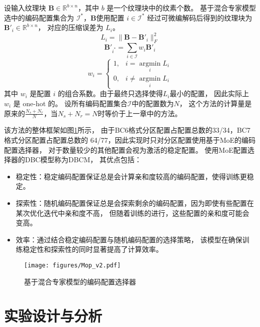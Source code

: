 设输入纹理块 $\mathbf{B}\in\mathbb{R}^{b\times n}$，其中 $b$ 是一个纹理块中的纹素个数。
基于混合专家模型选中的编码配置集合为 $\mathcal{I}^*$，$\mathbf{B}$使用配置 $i\in\mathcal{I}^*$ 
经过可微编解码后得到的纹理块为 $\mathbf{B}'_i\in\mathbb{R}^{b\times n}$，
对应的压缩误差为 $L_i$。
\begin{equation}
L_i=\|\mathbf{B}-\mathbf{B}'_i\|_F^2
\end{equation}
\begin{equation}
\mathbf{B}'_{i^*}=\sum_{i\in\mathcal{I}} w_i\mathbf{B}'_i
\end{equation}
\begin{equation}
    w_i =\left\{\begin{matrix}
        1,& i=\mathop{\arg\min}\limits_{i} L_i
        \\0,& i\ne\mathop{\arg\min}\limits_{i} L_i
        \end{matrix}\right.
\end{equation}
其中 $w_i$ 是配置 $i$ 的组合系数。由于最终只选择使得$L_i$最小的配置，
因此实际上 $w_i$ 是 one-hot 的。
设所有编码配置集合$\mathcal{I}$中的配置数为$N$，
这个方法的计算量是原来的$\frac{N_s+N_r}{N}$，当$N_s+N_r=N$时等价于上一章中的方法。

该方法的整体框架如图\ref{fig:Mop}所示，
由于BC6格式分区配置占配置总数的33/34，BC7格式分区配置占配置总数的
64/77，因此实现时只对分区配置使用基于MoE的编码配置选择器，
对于数量较少的其他配置会视为激活的稳定配置。
使用MoE配置选择器的DBC模型称为DBCM，
其优点包括：
\begin{itemize}
\item 稳定性：稳定编码配置保证总是会计算亲和度较高的编码配置，使得训练更稳定。
\item 探索性：随机编码配置保证总是会探索剩余的编码配置，因为即使有些配置在某次优化迭代中亲和度不高，
但随着训练的进行，这些配置的亲和度可能会变高。
\item 效率：通过结合稳定编码配置与随机编码配置的选择策略，
该模型在确保训练稳定性和探索性的同时显著提高了计算效率。
\end{itemize}
\begin{figure}[htbp]
    \centering
    \texttt{[image: figures/Mop\_v2.pdf]}
    \caption{基于混合专家模型的编码配置选择器}
    \label{fig:Mop}
\end{figure}


\section{实验设计与分析}

